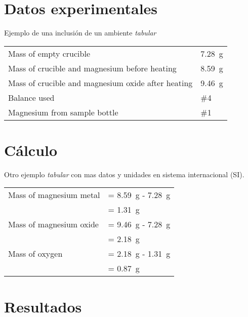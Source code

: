 \documentclass[11pt,letterpaper]{article}
\begin{document}

\section{Datos experimentales}

Ejemplo de una inclusi\'on de un ambiente \textit{tabular}

\begin{tabular}{ll}
Mass of empty crucible & \SI{7.28}{\gram}\\
Mass of crucible and magnesium before heating & \SI{8.59}{\gram}\\
Mass of crucible and magnesium oxide after heating & \SI{9.46}{\gram}\\
Balance used & \#4\\
Magnesium from sample bottle & \#1
\end{tabular}


\section{C\'alculo}

Otro ejemplo \textit{tabular} con mas datos y unidades en sistema internacional (SI).

\begin{tabular}{ll}
Mass of magnesium metal & = \SI{8.59}{\gram} - \SI{7.28}{\gram}\\
& = \SI{1.31}{\gram}\\
Mass of magnesium oxide & = \SI{9.46}{\gram} - \SI{7.28}{\gram}\\
& = \SI{2.18}{\gram}\\
Mass of oxygen & = \SI{2.18}{\gram} - \SI{1.31}{\gram}\\
& = \SI{0.87}{\gram}
\end{tabular}




\section{Resultados}
\end{document}
